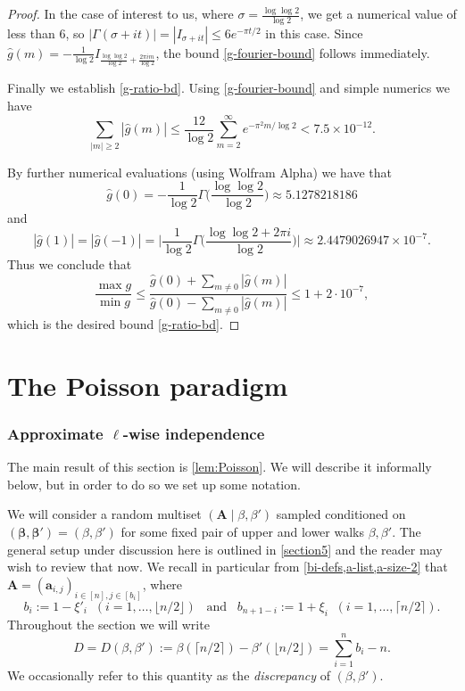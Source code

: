 \documentclass[11pt,reqno]{amsart}
\numberwithin{equation}{section}
\theoremstyle{definition}
\theoremstyle{remark}
\newcommand{\mbf}{\mathbf}
\newcommand{\wh}{\widehat}
\def\boldbeta{\boldsymbol\beta}
\renewcommand{\le}{\leqslant}
\renewcommand{\ge}{\geqslant}
\begin{document}
\begin{proof}
In the case of interest to us, where $\sigma = \frac{\log \log 2}{\log 2}$, we get a numerical value of less than $6$, so $|\Gamma(\sigma + it)| = |I_{\sigma + it}| \le 6 e^{-\pi t/2}$ in this case. Since $\widehat{g}(m) = -\frac{1}{\log 2} I_{\frac{\log \log 2}{\log 2} + \frac{2\pi i m}{\log 2}}$, the bound \cref{g-fourier-bound} follows immediately.

Finally we establish \cref{g-ratio-bd}. Using \cref{g-fourier-bound} and simple numerics we have
\[
\sum_{|m| \ge 2} |\wh{g}(m)|  \le \frac{12}{\log 2} \sum_{m = 2}^{\infty} e^{-\pi^2 m/\log 2} < 7.5 \times 10^{-12}.
\]

By further numerical evaluations (using Wolfram Alpha) we have that 
\[
\wh{g}(0) = -\frac{1}{\log 2} \Gamma\big(\frac{\log \log 2}{\log 2}\big) \approx 5.1278218186\] and
\[ |\wh{g}(1)|  = |\wh{g}(-1)| = \Big|\frac{1}{\log 2}\Gamma\big(\frac{\log\log 2 + 2\pi i}{\log 2}\big)\Big| \approx 2.4479026947 \times 10^{-7}.
\]
Thus we conclude that
\[\frac{\max g}{\min g} \le \frac{\wh{g}(0) + \sum_{m\neq 0}|\wh{g}(m)|}{\wh{g}(0)-\sum_{m\neq 0}|\wh{g}(m)|}\le 1 + 2 \cdot 10^{-7},\] which is the desired bound \cref{g-ratio-bd}. 
\end{proof}



\part{The Poisson paradigm}\label{part3}


\section{Approximate \texorpdfstring{$\ell$}{}-wise independence}\label{sec3}

The main result of this section is \cref{lem:Poisson}. We will describe it informally below, but in order to do so we set up some notation.

We will consider a random multiset $(\mbf{A} \mid \beta, \beta')$ sampled conditioned on $(\boldbeta,\boldbeta') = (\beta, \beta')$ for some fixed pair of upper and lower walks $\beta,\beta'$. The general setup under discussion here is outlined in \cref{section5} and the reader may wish to review that now. We recall in particular from \cref{bi-defs,a-list,a-size-2} that
 $\mbf{A} = (\mbf{a}_{i,j})_{i \in [n], j \in [b_i]}$, where 
 \begin{equation}\label{bi-defs-rept} b_{i} := 1 - \xi'_i \; \;  (i = 1,\dots, \lfloor n/2\rfloor) \;\;\; \mbox{and}\;\;\;  b_{n + 1 - i} := 1 + \xi_i \; \; (i = 1,\dots, \lceil n/2\rceil).\end{equation}
 Throughout the section we will write
 \begin{equation}\label{disc-def} D = D(\beta,\beta') := \beta(\lceil n/2\rceil) - \beta'(\lfloor n/2\rfloor) = \sum_{i = 1}^n b_i - n.\end{equation}
 We occasionally refer to this quantity as the \emph{discrepancy} of $(\beta, \beta')$.
\end{document}
